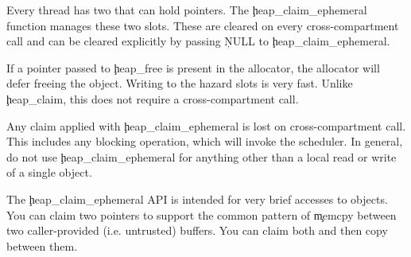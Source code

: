 Every thread has two  that can hold pointers.
The \c{heap_claim_ephemeral} function manages these two slots.
These are cleared on every cross-compartment call and can be cleared explicitly by passing \c{NULL} to \c{heap_claim_ephemeral}.

If a pointer passed to \c{heap_free} is present in the allocator, the allocator will defer freeing the object.
Writing to the hazard slots is very fast.
Unlike \c{heap_claim}, this does not require a cross-compartment call.

\begin{caution}
	Any claim applied with \c{heap_claim_ephemeral} is lost on  cross-compartment call.
	This includes any blocking operation, which will invoke the scheduler.
	In general, do not use \c{heap_claim_ephemeral} for anything other than a local read or write of a single object.
\end{caution}

The \c{heap_claim_ephemeral} API is intended for very brief accesses to objects.
You can claim two pointers to support the common pattern of \c{memcpy} between two caller-provided (i.e. untrusted) buffers.
You can claim both and then copy between them.

